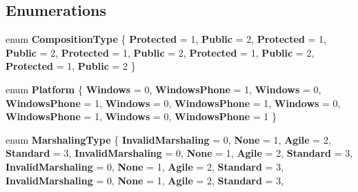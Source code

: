 \subsection*{Enumerations}
\begin{DoxyCompactItemize}
\item 
\mbox{\label{namespace_windows_1_1_foundation_1_1_metadata_a505a6f2bc4b2b9794234c3c04a49dab7}} 
enum {\bfseries Composition\+Type} \{ \newline
{\bfseries Protected} = 1, 
{\bfseries Public} = 2, 
{\bfseries Protected} = 1, 
{\bfseries Public} = 2, 
\newline
{\bfseries Protected} = 1, 
{\bfseries Public} = 2, 
{\bfseries Protected} = 1, 
{\bfseries Public} = 2, 
\newline
{\bfseries Protected} = 1, 
{\bfseries Public} = 2
 \}
\item 
\mbox{\label{namespace_windows_1_1_foundation_1_1_metadata_ac74fec362ca55a3b5379960a1fde476d}} 
enum {\bfseries Platform} \{ \newline
{\bfseries Windows} = 0, 
{\bfseries Windows\+Phone} = 1, 
{\bfseries Windows} = 0, 
{\bfseries Windows\+Phone} = 1, 
\newline
{\bfseries Windows} = 0, 
{\bfseries Windows\+Phone} = 1, 
{\bfseries Windows} = 0, 
{\bfseries Windows\+Phone} = 1, 
\newline
{\bfseries Windows} = 0, 
{\bfseries Windows\+Phone} = 1
 \}
\item 
\mbox{\label{namespace_windows_1_1_foundation_1_1_metadata_af96a9466daa74933d167e8e5777f203f}} 
enum {\bfseries Marshaling\+Type} \{ \newline
{\bfseries Invalid\+Marshaling} = 0, 
{\bfseries None} = 1, 
{\bfseries Agile} = 2, 
{\bfseries Standard} = 3, 
\newline
{\bfseries Invalid\+Marshaling} = 0, 
{\bfseries None} = 1, 
{\bfseries Agile} = 2, 
{\bfseries Standard} = 3, 
\newline
{\bfseries Invalid\+Marshaling} = 0, 
{\bfseries None} = 1, 
{\bfseries Agile} = 2, 
{\bfseries Standard} = 3, 
\newline
{\bfseries Invalid\+Marshaling} = 0, 
{\bfseries None} = 1, 
{\bfseries Agile} = 2, 
{\bfseries Standard} = 3, 
\newline

\end{DoxyCompactItemize}
